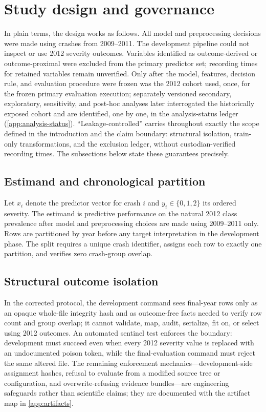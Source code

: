 \documentclass[11pt,letterpaper]{article}
\begin{document}
\section{Study design and governance}
In plain terms, the design works as follows. All model and preprocessing decisions were made using crashes from 2009--2011. The development pipeline could not inspect or use 2012 severity outcomes. Variables identified as outcome-derived or outcome-proximal were excluded from the primary predictor set; recording times for retained variables remain unverified. Only after the model, features, decision rule, and evaluation procedure were frozen was the 2012 cohort used, once, for the frozen primary evaluation execution; separately versioned secondary, exploratory, sensitivity, and post-hoc analyses later interrogated the historically exposed cohort and are identified, one by one, in the analysis-status ledger (\cref{app:analysis-status}). ``Leakage-controlled'' carries throughout exactly the scope defined in the introduction and the claim boundary: structural isolation, train-only transformations, and the exclusion ledger, without custodian-verified recording times. The subsections below state these guarantees precisely.

\subsection{Estimand and chronological partition}
Let $x_i$ denote the predictor vector for crash $i$ and $y_i\in\{0,1,2\}$ its ordered severity. The estimand is predictive performance on the natural 2012 class prevalence after model and preprocessing choices are made using 2009--2011 only. Rows are partitioned by year before any target interpretation in the development phase. The split requires a unique crash identifier, assigns each row to exactly one partition, and verifies zero crash-group overlap.

\subsection{Structural outcome isolation}
In the corrected protocol, the development command sees final-year rows only as an opaque whole-file integrity hash and as outcome-free facts needed to verify row count and group overlap; it cannot validate, map, audit, serialize, fit on, or select using 2012 outcomes. An automated sentinel test enforces the boundary: development must succeed even when every 2012 severity value is replaced with an undocumented poison token, while the final-evaluation command must reject the same altered file. The remaining enforcement mechanics---development-side assignment hashes, refusal to evaluate from a modified source tree or configuration, and overwrite-refusing evidence bundles---are engineering safeguards rather than scientific claims; they are documented with the artifact map in \cref{app:artifacts}.
\end{document}
